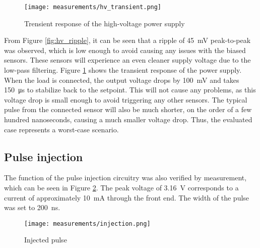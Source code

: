\FloatBarrier
\begin{figure}[!htpb]
    \begin{center}
        \texttt{[image: measurements/hv\_transient.png]}
        \caption{Trensient response of the high-voltage power supply}
        \label{fig:hv_transient}
    \end{center}
\end{figure}
\FloatBarrier

From Figure \ref{fig:hv_ripple}, it can be seen that a ripple of \SI{45}{\milli\volt} peak-to-peak was observed, which is low enough to avoid causing any issues with the biased sensors. These sensors will experience an even cleaner supply voltage due to the low-pass filtering. Figure \ref{fig:hv_transient} shows the transient response of the power supply. When the load is connected, the output voltage drops by \SI{100}{\milli\volt} and takes \SI{150}{\micro\second} to stabilize back to the setpoint. This will not cause any problems, as this voltage drop is small enough to avoid triggering any other sensors. The typical pulse from the connected sensor will also be much shorter, on the order of a few hundred nanoseconds, causing a much smaller voltage drop. Thus, the evaluated case represents a worst-case scenario.

\subsection{Pulse injection}
The function of the pulse injection circuitry was also verified by measurement, which can be seen in Figure \ref{fig:injection_meas}. The peak voltage of \SI{3.16}{\volt} corresponds to a current of approximately \SI{10}{\milli\ampere} through the front end. The width of the pulse was set to \SI{200}{\nano\second}.

\FloatBarrier
\begin{figure}[!htpb]
    \begin{center}
        \texttt{[image: measurements/injection.png]}
        \caption{Injected pulse}
        \label{fig:injection_meas}
    \end{center}
\end{figure}
\FloatBarrier

